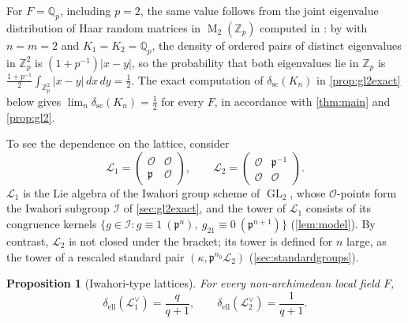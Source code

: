 \documentclass[11pt,reqno]{amsart}
\numberwithin{equation}{section}
\theoremstyle{plain}
\newtheorem{proposition}[theorem]{Proposition}
\theoremstyle{definition}
\theoremstyle{remark}
\theoremstyle{plain}
\newcommand{\Z}{\mathbb{Z}}      %
\newcommand{\Q}{\mathbb{Q}}      %
\newcommand{\OO}{\mathcal{O}}    %
\newcommand{\pp}{\mathfrak{p}}   %
\newcommand{\Lat}{\mathcal{L}}   %
\newcommand{\g}{\mathfrak{g}}    %
\newcommand{\scd}[1]{\delta_{\mathrm{sc}}(#1)}
\newcommand{\elld}[2][]{\delta_{\mathrm{ell}}^{#1}(#2)}  %
\newcommand{\Iw}{\mathcal{I}}                   %
\newcommand{\abs}[1]{\lvert#1\rvert}
\DeclareMathOperator{\GL}{GL}
\DeclareMathOperator{\Mat}{M}
\begin{document}
For $F=\Q_p$, including $p=2$, the same value follows from the joint
eigenvalue distribution of Haar random matrices in $\Mat_2(\Z_p)$
computed in \cite{SVP26}: by \cite[Theorem~1.7]{SVP26} with $n=m=2$
and $K_1=K_2=\Q_p$, the density of ordered pairs of distinct eigenvalues
in $\Z_p^2$ is $(1+p^{-1})\abs{x-y}$, so the probability that both eigenvalues lie in
$\Z_p$ is $\frac{1+p^{-1}}2\int_{\Z_p^2}\abs{x-y}\,dx\,dy=\frac12$. The
exact computation of $\scd{K_n}$ in \cref{prop:gl2exact} below gives
$\lim_n\scd{K_n}=\frac12$ for every $F$, in accordance with
\cref{thm:main} and \cref{prop:gl2}.

To see the dependence on the lattice, consider
\begin{equation}\label{eq:iwahorilattices}
\Lat_1=\begin{pmatrix}\OO&\OO\\\pp&\OO\end{pmatrix},\qquad
\Lat_2=\begin{pmatrix}\OO&\pp^{-1}\\\OO&\OO\end{pmatrix}.
\end{equation}
$\Lat_1$ is the Lie algebra of the Iwahori group scheme of $\GL_2$,
whose $\OO$-points form the Iwahori subgroup $\Iw$ of \cref{sec:gl2exact},
and the tower of $\Lat_1$ consists of its congruence kernels
$\{g\in\Iw:g\equiv1\ (\pp^n),\ g_{21}\equiv0\ (\pp^{n+1})\}$
(\cref{lem:model}).
By contrast, $\Lat_2$ is not closed under the bracket; its tower is
defined for $n$ large, as the tower of a rescaled standard pair
$(\kappa,\pp^{n_0}\Lat_2)$ (\cref{sec:standardgroups}).

\begin{proposition}[Iwahori-type lattices]\label{prop:iwahori}
For every non-archimedean local field $F$,
\[
\elld{\Lat_1^\vee}=\frac q{q+1},\qquad \elld{\Lat_2^\vee}=\frac1{q+1}.
\]
\end{proposition}
\end{document}
